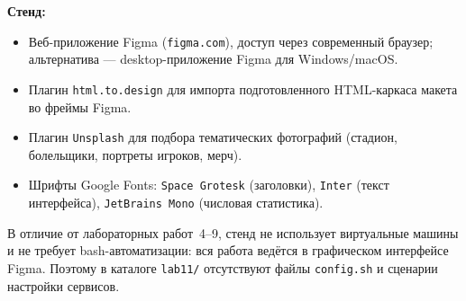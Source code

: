 \textbf{Стенд:}
\begin{itemize}
  \item Веб-приложение Figma (\texttt{figma.com}), доступ через
        современный браузер; альтернатива — desktop-приложение Figma
        для Windows/macOS.
  \item Плагин \texttt{html.to.design} для импорта подготовленного
        HTML-каркаса макета во фреймы Figma.
  \item Плагин \texttt{Unsplash} для подбора тематических фотографий
        (стадион, болельщики, портреты игроков, мерч).
  \item Шрифты Google Fonts: \texttt{Space~Grotesk} (заголовки),
        \texttt{Inter} (текст интерфейса), \texttt{JetBrains~Mono}
        (числовая статистика).
\end{itemize}

В отличие от лабораторных работ~4--9, стенд не использует виртуальные
машины и не требует bash-автоматизации: вся работа ведётся в графическом
интерфейсе Figma. Поэтому в каталоге \texttt{lab11/} отсутствуют файлы
\texttt{config.sh} и сценарии настройки сервисов.

\endinput
